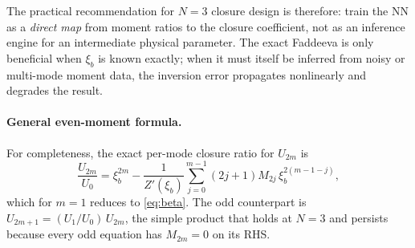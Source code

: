 \documentclass[11pt]{article}
\newcommand{\xib}{\xi_b}
\begin{document}
The practical recommendation for $N=3$ closure design is therefore: train
the NN as a \emph{direct map} from moment ratios to the closure coefficient,
not as an inference engine for an intermediate physical parameter.  The
exact Faddeeva is only beneficial when $\xib$ is known exactly; when it
must itself be inferred from noisy or multi-mode moment data, the
inversion error propagates nonlinearly and degrades the result.

\paragraph{General even-moment formula.}
For completeness, the exact per-mode closure ratio for $U_{2m}$ is
\begin{equation}\label{eq:beta-general}
  \frac{U_{2m}}{U_0} = \xib^{2m}
  - \frac{1}{Z'(\xib)}\sum_{j=0}^{m-1}(2j+1)M_{2j}\,\xib^{2(m-1-j)},
\end{equation}
which for $m=1$ reduces to \eqref{eq:beta}.  The odd counterpart is
$U_{2m+1} = (U_1/U_0)\,U_{2m}$, the simple product that holds at $N=3$
and persists because every odd equation has $M_{2m} = 0$ on its RHS.
\end{document}
